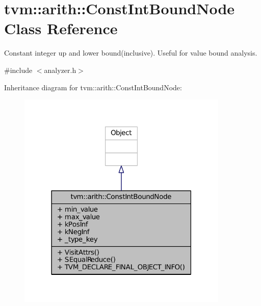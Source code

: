 \hypertarget{classtvm_1_1arith_1_1ConstIntBoundNode}{}\section{tvm\+:\+:arith\+:\+:Const\+Int\+Bound\+Node Class Reference}
\label{classtvm_1_1arith_1_1ConstIntBoundNode}


Constant integer up and lower bound(inclusive). Useful for value bound analysis.  




{\ttfamily \#include $<$analyzer.\+h$>$}



Inheritance diagram for tvm\+:\+:arith\+:\+:Const\+Int\+Bound\+Node\+:
\nopagebreak
\begin{figure}[H]
\begin{center}
\leavevmode
\includegraphics[width=285pt]{classtvm_1_1arith_1_1ConstIntBoundNode__inherit__graph}
\end{center}
\end{figure}


